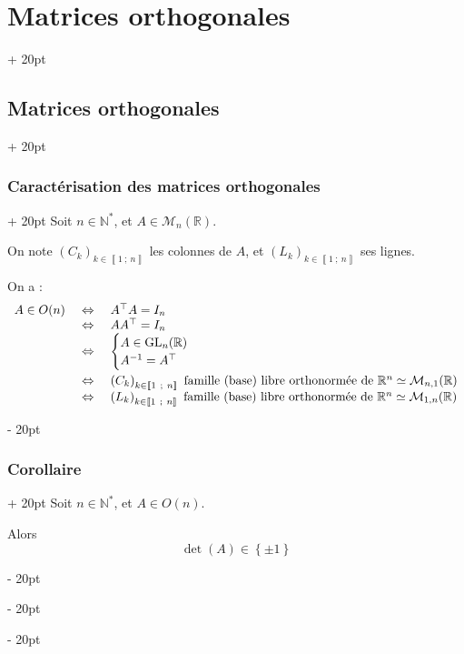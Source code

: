 \documentclass[a4paper, 12pt, twoside]{article}
\newcommand{\N}{\mathbb{N}} %
\newcommand{\R}{\mathbb{R}} %
\newcommand{\nset}[2]{\left\llbracket #1\ ;\ #2 \right\rrbracket}
\newcommand{\lr}[1]{\left( #1 \right)}
\newcommand{\set}[1]{\left\{ #1 \right\}}
\newcommand{\ssi}{\ \Leftrightarrow \ }
\newcommand{\ind}[1][20pt]{\advance\leftskip + #1}
\newcommand{\deind}[1][20pt]{\advance\leftskip - #1}
\newenvironment{indt}[2][20pt]{#2 \par \ind[#1]}{\par \deind} %
\begin{document}
\begin{indt}{\section{Matrices orthogonales}}
\begin{indt}{\subsection{Matrices orthogonales}}
            \begin{indt}{\subsubsection{Caractérisation des matrices orthogonales}}
                Soit $n \in \N^*$, et $A \in \mathcal M_n(\R)$.

                On note $\lr{C_k}_{k \in \nset 1 n}$ les colonnes de $A$, et $\lr{L_k}_{k \in \nset 1 n}$ ses lignes.

                On a :
                \[
                    \begin{array}{rcl}
                        A \in O(n)
                        &\ssi&
                        A^\top A = I_n
                        \\
                        &\ssi& A A^\top = I_n
                        \\
                        &\ssi&
                        \begin{cases}
                            A \in \mathrm{GL}_n(\R)
                            \\
                            A^{-1} = A^\top
                        \end{cases}
                        \vspace{3pt}
                        \\
                        &\ssi&
                        \lr{C_k}_{k \in \nset 1 n}\ \text{famille (base) libre orthonormée de}\ \R^n \simeq \mathcal M_{n, 1}(\R)
                        \\
                        &\ssi&
                        \lr{L_k}_{k \in \nset 1 n}\ \text{famille (base) libre orthonormée de}\ \R^n \simeq \mathcal M_{1, n}(\R)
                    \end{array}
                \]
            \end{indt}

            \vspace{12pt}
            
            \begin{indt}{\subsubsection{Corollaire}}
                Soit $n \in \N^*$, et $A \in O(n)$.

                Alors
                \[
                    \det(A) \in \set{\pm 1}
                \]
            \end{indt}


\end{indt}
\end{indt}
\end{document}
